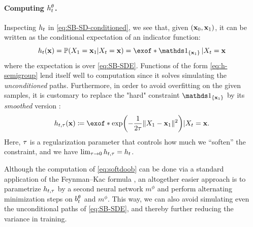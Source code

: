 \paragraph{Computing $h_t^\theta$.}

Inspecting $h_t$ in \eqref{eq:SB-SD-conditioned}, we see that, given $(\mathbf{x}_0,\mathbf{x}_1)$, it can be written as the conditional expectation of an indicator function:
\begin{equation}
\label{eq:h-semigroup}
\doob(\x) = \prob(X_1 = \x_1\vert X_t = \x) = \exof*{
\one_{\{\x_1\}}\vert X_t = \x}
\end{equation}where the expectation is over \eqref{eq:SB-SDE}. Functions of the form \eqref{eq:h-semigroup} lend itself well to computation since it solves simulating the \emph{unconditioned} paths.
Furthermore, in order to avoid overfitting on the given samples, it is customary to replace the "hard" constraint $\one_{\{\x_1\}}$ by its \emph{smoothed} version \citep{zhang2021path, holdijk2022path}: 
\begin{equation}
\label{eq:softdoob}
\doobs(\x) \defeq \exof*{  \exp\parens*{-\frac{1}{2\reg}\norm{X_\horizon-\x_1}^2 }  \vert X_t = \x}.
\end{equation}Here, $\tau$ is a regularization parameter that controls how much we ``soften'' the constraint, and we have $\lim_{\tau\to 0} h_{t,\tau} = h_t$.


Although the computation of \eqref{eq:softdoob} can be done via a standard application of the Feynman–Kac formula \citep{rogers2000diffusions}, an altogether easier approach is to parametrize $h_{t,\tau}$ by a second neural network $m^{\phi}$ and perform alternating minimization steps on $b_t^\theta$ and $m^{\phi}$. This way, we can also avoid simulating even the unconditional paths of \eqref{eq:SB-SDE}, and thereby further reducing the variance in training.


